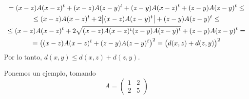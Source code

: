 \begin{ej}
\begin{enumerate}[(a)]
\begin{enumerate}[i)]
\begin{gather*}
						= (x-z)A(x-z)^t + (x-z)A(z-y)^t + (z-y)A(x-z)^t + (z-y)A(z-y)^t \leq \\
						\leq (x-z)A(x-z)^t + 2 \abs{(x-z)A(z-y)^t} + (z-y)A(z-y)^t \leq \\ \leq (x-z)A(x-z)^t + 2 \sqrt{(x-z)A(x-z)^t(z-y)A(z-y)^t} + 
						(z-y)A(z-y)^t = \\ = \left( (x-z)A(x-z)^t + (z-y)A(z-y)^t \right)^2 = \left( d(x,z) + d(z,y) \right)^2
					\end{gather*}
					Por lo tanto, $d(x,y) \leq d(x,z) + d(z,y)$.
			\end{enumerate}
			Ponemos un ejemplo, tomando
			\[
				A =
				\begin{pmatrix}
					1 & 2 \\
					2 & 5
				\end{pmatrix}
			\]
			\begin{center}
				
			\end{center}
	\end{enumerate}
\end{ej}

